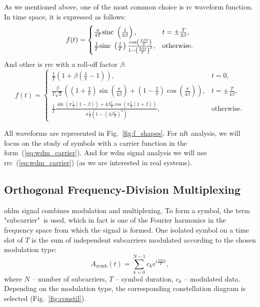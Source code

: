 As we mentioned above, one of the most common choice is \Gls{rc} waveform function. In time space, it is expressed as follows:
\begin{equation}
    f(t) = 
\begin{cases} 
\frac{\pi}{4T} \mathrm{sinc}\; \left( \frac{1}{2\beta} \right), & t = \pm \frac{T}{2\beta}, \\
\frac{1}{T} \mathrm{sinc}\; \left( \frac{t}{T} \right) \frac{\cos\left( \frac{\pi \beta t}{T} \right)}{1 - \left( \frac{2\beta t}{T} \right)^2}, & \text{otherwise}.
\end{cases}
\label{eq:rc_time}
\end{equation}
And other is \Gls{rrc} with a roll-off factor $\beta$:
\begin{equation}
    f(t) = \begin{cases}
    \frac{1}{T}\left( 1 + \beta \left( \frac{4}{\pi} - 1 \right) \right),& t = 0, \\
    \frac{\beta}{T \sqrt{2}} \left( \left( 1 + \frac{2}{\pi} \right) \sin\left( \frac{\pi}{4\beta} \right) + \left( 1 - \frac{2}{\pi} \right) \cos \left( \frac{\pi}{4\beta} \right) \right),& t = \pm \frac{T}{4 \beta},\\
    \frac{1}{T} \frac{\sin \left( \pi \frac{t}{T} \left( 1 - \beta \right) \right) + 4 \beta \frac{t}{T} \cos \left( \pi \frac{t}{T} \left( 1 + \beta \right) \right)}{\pi \frac{t}{T} \left( 1 - \left( 4\beta \frac{t}{T} \right)^2 \right)},&\text{otherwise}.
    \end{cases}
\label{eq:rrc_time}
\end{equation}

All waveforms are represented in Fig.~\ref{fig:f_shapes}.
For \Gls{nft} analysis, we will focus on the study of symbols with a carrier function in the form~(\ref{eq:wdm_carrier}). And for \gls{wdm} signal analysis we will use \gls{rrc}~(\ref{eq:wdm_carrier}) (as we are interested in real systems).




\subsection{
Orthogonal Frequency-Division Multiplexing
}
\label{sec:ofdm}

\gls{ofdm} signal combines modulation and multiplexing. To form a symbol, the term "subcarrier"\ is used, which in fact is one of the Fourier harmonics in the frequency space from which the signal is formed. One isolated symbol on a time slot of $ T $ is the sum of independent subcarriers modulated according to the chosen modulation type:
\begin{equation}
    A_{\text{symb}}(t) = \sum_{k=0}^{N-1} c_k e^{i \frac{2 \pi k}{T} t} {,}
    \label{eq:ofdm_symbol}
\end{equation}
where $N$ -- number of subcarriers,
$T$ -- symbol duration,
$c_k$ -- modulated data. 
Depending on the modulation type, the corresponding constellation diagram is selected (Fig.~\ref{fig:constil}).

